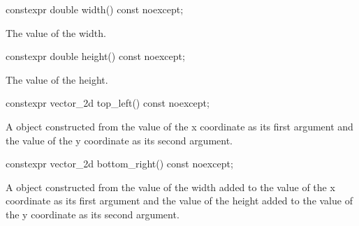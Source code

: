 \begin{itemdecl}
constexpr double width() const noexcept;
\end{itemdecl}
\begin{itemdescr}
\pnum
\returns
The value of the width.
\end{itemdescr}

\begin{itemdecl}
constexpr double height() const noexcept;
\end{itemdecl}
\begin{itemdescr}
\pnum
\returns
The value of the height.
\end{itemdescr}

\begin{itemdecl}
constexpr vector_2d top_left() const noexcept;
\end{itemdecl}
\begin{itemdescr}
\pnum
\returns
A  object constructed from the value of the x coordinate as its first argument and the value of the y coordinate as its second argument.
\end{itemdescr}

\begin{itemdecl}
constexpr vector_2d bottom_right() const noexcept;
\end{itemdecl}
\begin{itemdescr}
\pnum
\returns
A  object constructed from the value of the width added to the value of the x coordinate as its first argument and the value of the height added to the value of the y coordinate as its second argument.
\end{itemdescr}
